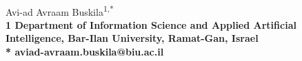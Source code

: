 \documentclass[10pt,letterpaper]{article}
\date{}
\begin{document}
\vspace*{0.35in}

\begin{flushleft}
{\Large
\textbf{}
}
\newline
\\
Avi-ad Avraam Buskila\textsuperscript{1,*}
\\
\bigskip
\bf{1} Department of Information Science and Applied Artificial Intelligence, Bar-Ilan University, Ramat-Gan, Israel
\\
\bigskip
* aviad-avraam.buskila@biu.ac.il
\end{flushleft}

\end{document}
